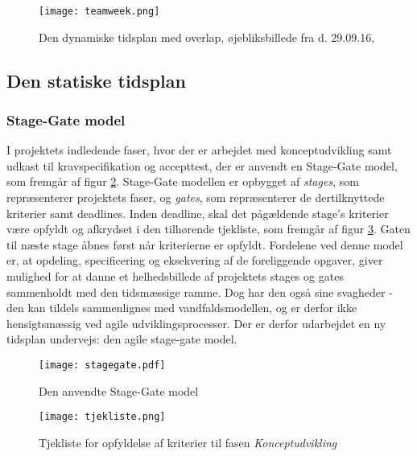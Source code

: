 \begin{figure}
\centering
\texttt{[image: teamweek.png]}	
\caption{Den dynamiske tidsplan med overlap, øjebliksbillede fra d. 29.09.16,}
\label{fig:teamweek}
\end{figure}

\subsection{Den statiske tidsplan}
\label{subsec:statisk}
\subsubsection{Stage-Gate model}
I projektets indledende faser, hvor der er arbejdet med konceptudvikling samt udkast til kravspecifikation og accepttest, der er anvendt en Stage-Gate model, som fremgår af figur \ref{fig:stagegate}. Stage-Gate modellen er opbygget af \textit{stages}, som repræsenterer projektets faser, og \textit{gates}, som repræsenterer de dertilknyttede kriterier samt deadlines. Inden deadline, skal det pågældende stage's kriterier være opfyldt og afkrydset i den tilhørende tjekliste, som fremgår af figur \ref{fig:tjekliste}. Gaten til næste stage åbnes først når kriterierne er opfyldt. Fordelene ved denne model er, at opdeling, specificering og eksekvering af de foreliggende opgaver, giver mulighed for at danne et helhedsbillede af projektets stages og gates sammenholdt med den tidsmæssige ramme. Dog har den også sine svagheder - den kan tildels sammenlignes med vandfaldsmodellen, og er derfor ikke hensigtsmæssig ved agile udviklingsprocesser. Der er derfor udarbejdet en ny tidsplan undervejs: den agile stage-gate model. 

\newpage
\begin{landscape}
\begin{figure}
\centering	
\texttt{[image: stagegate.pdf]}
\caption{Den anvendte Stage-Gate model}
\label{fig:stagegate}
\end{figure}
\end{landscape}

\begin{figure}[htb]
\centering
\texttt{[image: tjekliste.png]}
\caption{Tjekliste for opfyldelse af kriterier til fasen \textit{Konceptudvikling}}
\label{fig:tjekliste}
\end{figure}

